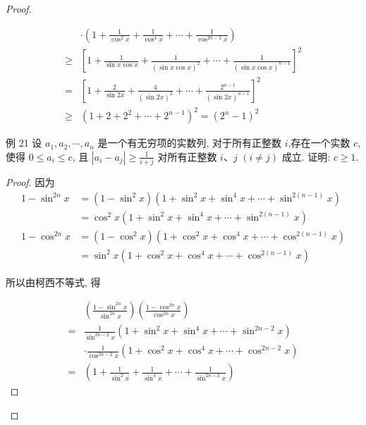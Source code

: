 \begin{proof}
\begin{example}
	$$
	\begin{aligned}
	& \cdot\left(1+\frac{1}{\cos ^{2} x}+\frac{1}{\cos ^{4} x}+\cdots+\frac{1}{\cos ^{2 n-2} x}\right) \\
	\geqslant & {\left[1+\frac{1}{\sin x \cos x}+\frac{1}{(\sin x \cos x)^{2}}+\cdots+\frac{1}{(\sin x \cos x)^{n-1}}\right]^{2} } \\
	= & {\left[1+\frac{2}{\sin 2 x}+\frac{4}{(\sin 2 x)^{2}}+\cdots+\frac{2^{n-1}}{(\sin 2 x)^{n-1}}\right]^{2} } \\
	\geqslant & \left(1+2+2^{2}+\cdots+2^{n-1}\right)^{2}=\left(2^{n}-1\right)^{2}
	\end{aligned}
	$$
\begin{example}	
	例 21 设 $a_{1}, a_{2}, \cdots, a_{n}$ 是一个有无穷项的实数列, 对于所有正整数 $i$,存在一个实数 $c$, 使得 $0 \leqslant a_{i} \leqslant c$, 且 $\left|a_{i}-a_{j}\right| \geqslant \frac{1}{i+j}$ 对所有正整数 $i 、 j$ $(i \neq j)$ 成立. 证明: $c \geqslant 1$.
\end{example}
\begin{proof}
	因为
	$$
	\begin{aligned}
	1-\sin ^{2 n} x & =\left(1-\sin ^{2} x\right)\left(1+\sin ^{2} x+\sin ^{4} x+\cdots+\sin ^{2(n-1)} x\right) \\
	& =\cos ^{2} x\left(1+\sin ^{2} x+\sin ^{4} x+\cdots+\sin ^{2(n-1)} x\right) \\
	1-\cos ^{2 n} x & =\left(1-\cos ^{2} x\right)\left(1+\cos ^{2} x+\cos ^{4} x+\cdots+\cos ^{2(n-1)} x\right) \\
	& =\sin ^{2} x\left(1+\cos ^{2} x+\cos ^{4} x+\cdots+\cos ^{2(n-1)} x\right)
	\end{aligned}
	$$
	
	所以由柯西不等式, 得
	
	$$
	\begin{aligned}
	& \left(\frac{1-\sin ^{2 n} x}{\sin ^{2 n} x}\right)\left(\frac{1-\cos ^{2 n} x}{\cos ^{2 n} x}\right) \\
	= & \frac{1}{\sin ^{2 n-2} x}\left(1+\sin ^{2} x+\sin ^{4} x+\cdots+\sin ^{2 n-2} x\right) \\
	& \cdot \frac{1}{\cos ^{2 n-2} x}\left(1+\cos ^{2} x+\cos ^{4} x+\cdots+\cos ^{2 n-2} x\right) \\
	= & \left(1+\frac{1}{\sin ^{2} x}+\frac{1}{\sin ^{4} x}+\cdots+\frac{1}{\sin ^{2 n-2} x}\right)
	\end{aligned}
	$$
	

\end{proof}
\end{example}
\end{proof}
